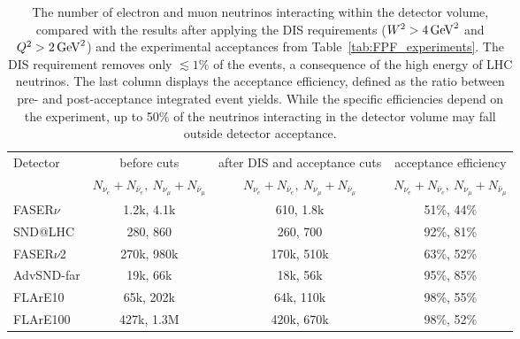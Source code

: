 \begin{table*}[t]
  \centering
  \small
  \renewcommand{\arraystretch}{1.70}
  \begin{tabularx}{0.99\textwidth}{p{}|c|c|c}
    \toprule
    \multirow{2}{*}{Detector} & before cuts & after DIS and acceptance cuts  & acceptance efficiency \\
    & $N_{\nu_e} + N_{\bar{\nu}_e},~N_{\nu_\mu} + N_{\bar{\nu}_\mu}$ &  $N_{\nu_e} + N_{\bar{\nu}_e},~N_{\nu_\mu} + N_{\bar{\nu}_\mu}$ &
    $N_{\nu_e} + N_{\bar{\nu}_e},~N_{\nu_\mu} + N_{\bar{\nu}_\mu}$\\
    \midrule
    \midrule
    FASER$\nu$ & 1.2k, 4.1k  & 610, 1.8k  & 51\%, 44\% \\
    SND@LHC & 280, 860 & 260, 700 & 92\%, 81\% \\
    \midrule
    \midrule
    FASER$\nu$2 & 270k, 980k   & 170k, 510k  & 63\%, 52\%\\
    AdvSND-far & 19k, 66k &  18k, 56k & 95\%, 85\%\\
    FLArE10 & 65k, 202k  & 64k, 110k & 98\%, 55\%\\
    FLArE100 & 427k, 1.3M   & 420k, 670k &98\%, 52\%  \\
    \bottomrule
  \end{tabularx}
  \vspace{0.2cm}
  \caption{The number of electron and muon neutrinos interacting within the detector volume,
    compared with the results after applying the DIS requirements  ($W^2 > 4\,{\rm GeV}^2$ and $Q^2 > 2\,{\rm GeV}^2$)
    and the experimental acceptances from Table~\ref{tab:FPF_experiments}.
    The DIS requirement removes only  $\lesssim 1\%$ of the events, a consequence of the high energy of
    LHC neutrinos.
    The last column displays the acceptance efficiency, defined as the ratio between pre- and post-acceptance
    integrated event yields.
    While the specific efficiencies depend on the experiment, up to 50\% of the neutrinos
  interacting in the detector volume may fall outside detector acceptance. }
\label{tab:acceptance}
\end{table*}

